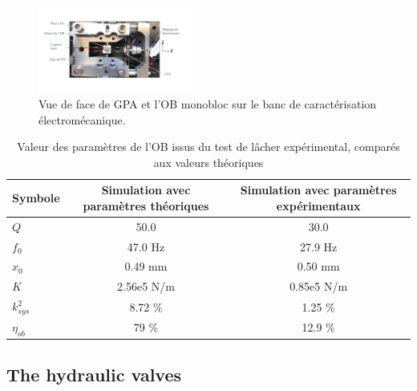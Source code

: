 \documentclass[3p,twocolumn,preprint]{elsarticle}
\begin{document}
\lipsum[1]
\begin{figure}[!htbp]
	\centering
	\captionsetup{justification=centering}
	\includegraphics[trim={1cm 3cm 2cm 2.5cm},clip,width=0.45\textwidth]{figures/BDT_OB+GPA.pdf}
	\caption{Vue de face de GPA et l’OB monobloc sur le banc de caractérisation
	électromécanique.}
	\label{fig:BDT_OB+GPA}
\end{figure}
\begin{table}[!htbp]
\centering
	\begin{tabular}{ l | c | c }
		\toprule
		\multicolumn{1}{c}{\textbf{Symbole}}  &
		\multicolumn{1}{c}{\textbf{Simulation avec paramètres théoriques}}  &
		\multicolumn{1}{c}{\textbf{Simulation avec paramètres expérimentaux}} \\
		\midrule
		$Q$                       & 50.0                  & 30.0 		  	\\  
		$f_0$                     & 47.0 Hz               & 27.9 Hz  		\\
		$x_0$                     & 0.49 mm               & 0.50 mm    		\\
		$K$                       & 2.56e5 N/m            & 0.85e5 N/m 		\\
		${k^2_{sys}}$             & 8.72 \%               & 1.25 \% 		\\
		$\eta_{ob}$               & 79 \%                 & 12.9 \%   		\\
		\bottomrule
	\end{tabular}
	\caption{Valeur des paramètres de l'OB issus du test de lâcher expérimental, comparés aux valeurs théoriques}
\label{tab:parametres_lacher_free}
\end{table} 
	\subsection{The hydraulic valves}	
	\label{The hydraulic valves}
\end{document}
